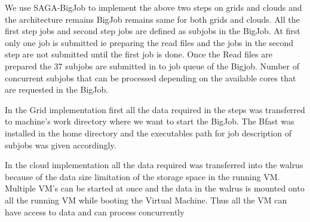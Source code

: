 \documentclass[12pt]{article}
\begin{document}
We use SAGA-BigJob to implement the above two steps on grids and clouds and 
the architecture remains BigJob remains same for both grids and clouds. All the first 
step jobs and second step jobs are defined as subjobs in the BigJob. At first only 
one job is submitted ie  preparing the read files and the jobs in the second step are not submitted
until the first job is done. Once the Read files are prepared the 37 subjobs are submitted in to 
job queue of the Bigjob. Number of concurrent subjobs that can be processed depending 
on the available cores that are requested in the BigJob.
  
In the Grid implementation first all the data required in the steps was transferred to machine's  work 
directory where we want to start the BigJob. The Bfast was installed in the home directory and the
executables path for job description of subjobs was given accordingly.

In the cloud implementation all the data required was transferred into the walrus because of the data size limitation of the storage space in the
running VM. Multiple VM's can be started at once and the data in the walrus is mounted onto all the running VM
while booting the Virtual Machine. Thus all the VM can have access to data and can process concurrently




\end{document}
